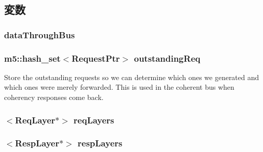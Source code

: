 \subsection{変数}
\hypertarget{classCoherentBus_a7040fa8d9fb24afb9f4fe245b135da19}{
\subsubsection[{dataThroughBus}]{ {\bf dataThroughBus}}}
\label{classCoherentBus_a7040fa8d9fb24afb9f4fe245b135da19}
\hypertarget{classCoherentBus_a8b5de6798515d1ac1236592c5ad7c521}{
\subsubsection[{outstandingReq}]{\setlength{\rightskip}{0pt plus 5cm}m5::hash\_\-set$<${\bf RequestPtr}$>$ {\bf outstandingReq}}}
\label{classCoherentBus_a8b5de6798515d1ac1236592c5ad7c521}
Store the outstanding requests so we can determine which ones we generated and which ones were merely forwarded. This is used in the coherent bus when coherency responses come back. \hypertarget{classCoherentBus_ab124575386549f77de080cd9fcaf2ba0}{
\subsubsection[{reqLayers}]{$<${\bf ReqLayer}$\ast$$>$ {\bf reqLayers}}}
\label{classCoherentBus_ab124575386549f77de080cd9fcaf2ba0}
\hypertarget{classCoherentBus_a2f42dda70e78f1e5e9574f11b465d173}{
\subsubsection[{respLayers}]{$<${\bf RespLayer}$\ast$$>$ {\bf respLayers}}}
